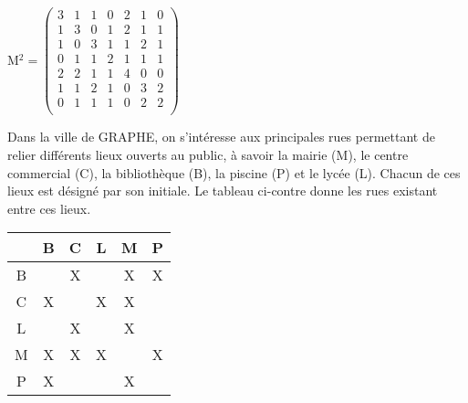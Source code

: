 \documentclass[]{prof}
\begin{document}
\begin{center}

\bigskip
{}

\bigskip
M$^2 =
\begin{pmatrix}
    3   &   1   &   1   &   0   &   2   &   1   &   0\\
    1   &   3   &   0   &   1   &   2   &   1   &   1\\
    1   &   0   &   3   &   1   &   1   &   2   &   1\\
    0   &   1   &   1   &   2   &   1   &   1   &   1\\
    2   &   2   &   1   &   1   &   4   &   0   &   0\\
    1   &   1   &   2   &   1   &   0   &   3   &   2\\
    0   &   1   &   1   &   1   &   0   &   2   &   2\\
\end{pmatrix}$
  \end{center}

\vfill\newpage\null 


\bigskip 
\begin{minipage}[l]{0,58\textwidth}
Dans la ville de GRAPHE, on s'intéresse aux principales rues permettant de relier différents lieux ouverts au public, à savoir la mairie (M), le centre commercial (C), la bibliothèque (B), la piscine (P) et le lycée (L). Chacun de ces lieux est désigné par son initiale. Le tableau ci-contre donne les rues existant entre ces lieux.
\end{minipage}\hfill
\begin{minipage}[]{0,38\textwidth}
\begin{center}
     \begin{tabular}{|*{5}{c|} c|} \cline{2-6}
        \multicolumn{1}{c|}{}
          & B   & C & L & M & P \\ \hline
        B &     & X &   & X & X \\ \hline
        C & X   &   & X & X &   \\ \hline
        L &     & X &   & X &   \\ \hline
        M & X   & X & X &   & X \\ \hline
        P & X   &   &   & X &   \\ \hline
    \end{tabular}
\end{center}
\end{minipage}
\end{document}
